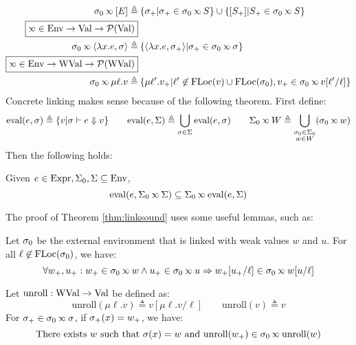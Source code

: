 \begin{align*}
  \ctx_0\semlink[E]\triangleq                            & \: \{\ctx_+|\ctx_+\in\ctx_0\semlink\event\}\cup\{[\event_+]|\event_+\in\ctx_0\semlink\event\}                                      \\
  \fbox{$\semlink\in\Ctx\rightarrow\Value\rightarrow\pset(\Value)$}                                                                                                                           \\
  \ctx_0\semlink\langle\lambda x.e,\ctx\rangle\triangleq & \: \{\langle\lambda x.e,\ctx_+\rangle|\ctx_+\in\ctx_0\semlink\ctx\}                                                                \\
  \fbox{$\semlink\in\Ctx\rightarrow\Walue\rightarrow\pset(\Walue)$}                                                                                                                           \\
  \ctx_0\semlink\mu\ell.v\triangleq                      & \: \{\mu\ell'.v_+|\ell'\not\in\FLoc(v)\cup\FLoc(\ctx_0), v_+\in\ctx_0\semlink v[\ell'/\ell]\}
\end{align*}
Concrete linking makes sense because of the following theorem.
First define:
\[\eval(e,\ctx)\triangleq\{v|\ctx\vdash e\Downarrow v\}\qquad\eval(e,\Sigma)\triangleq\bigcup_{\ctx\in\Sigma}\eval(e,\ctx)\qquad\Sigma_0\semlink W\triangleq\bigcup_{\substack{\ctx_0\in\Sigma_0\\w\in W}}(\ctx_0\semlink w)\]
Then the following holds:
\begin{thm}[Advance]\label{thm:linksound}
  Given $e\in\text{Expr},\Sigma_0,\Sigma\subseteq\text{Env}$,
  \[\eval(e,\Sigma_0\semlink\Sigma)\subseteq\Sigma_0\semlink\eval(e,\Sigma)\]
\end{thm}

The proof of Theorem \ref{thm:linksound} uses some useful lemmas, such as:
\begin{lem}
  Let $\sigma_0$ be the external environment that is linked with weak values $w$ and $u$.
  For all $\ell\not\in\text{FLoc}(\sigma_0)$, we have:
  \[\forall w_+,u_+:w_+\in\ctx_0\semlink w\wedge u_+\in\ctx_0\semlink u\Rightarrow w_+[u_+/\ell]\in\ctx_0\semlink w[u/\ell]\]
\end{lem}
\begin{lem}
  Let $\text{unroll}:\text{WVal}\rightarrow\text{Val}$ be defined as:
  \[\text{unroll}(\mu\ell.v)\triangleq v[\mu\ell.v/\ell]\qquad\text{unroll}(v)\triangleq v\]
  For $\ctx_+\in\ctx_0\semlink\ctx$, if $\sigma_+(x)=w_+$, we have:
  \[\text{There exists } w\text{ such that }\ctx(x)=w\text{ and }\text{unroll}(w_+)\in\ctx_0\semlink\text{unroll}(w)\]
\end{lem}

